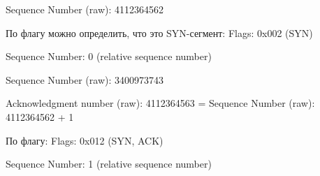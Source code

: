 \documentclass[a4paper,11pt]{article}
\begin{document}
Sequence Number (raw): 4112364562

По флагу можно определить, что это SYN-сегмент: Flags: 0x002 (SYN)

\begin{center}
\label{fig:image}
\end{center}
Sequence Number: 0    (relative sequence number)

Sequence Number (raw): 3400973743

Acknowledgment number (raw): 4112364563 = Sequence Number (raw): 4112364562 + 1

По флагу: Flags: 0x012 (SYN, ACK)

\begin{center}
\label{fig:image}
\end{center}
Sequence Number: 1    (relative sequence number)
\end{document}
